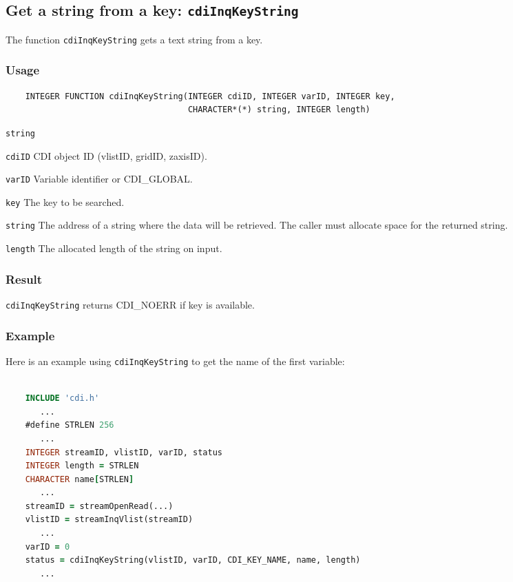 \subsection{Get a string from a key: \texttt{cdiInqKeyString}}
\label{cdiInqKeyString}

The function {\texttt{cdiInqKeyString}} gets a text string from a key.

\subsubsection*{Usage}

\begin{verbatim}
    INTEGER FUNCTION cdiInqKeyString(INTEGER cdiID, INTEGER varID, INTEGER key, 
                                     CHARACTER*(*) string, INTEGER length)
\end{verbatim}

\hspace*{4mm}\begin{minipage}[]{15cm}
\begin{deflist}{\texttt{string}\ }
\item[\texttt{cdiID}]
CDI object ID (vlistID, gridID, zaxisID).
\item[\texttt{varID}]
Variable identifier or CDI\_GLOBAL.
\item[\texttt{key}]
The key to be searched.
\item[\texttt{string}]
The address of a string where the data will be retrieved.
                    The caller must allocate space for the returned string.
\item[\texttt{length}]
The allocated length of the string on input.
\end{deflist}
\end{minipage}

\subsubsection*{Result}

{\texttt{cdiInqKeyString}} returns CDI\_NOERR if key is available.


\subsubsection*{Example}

Here is an example using {\texttt{cdiInqKeyString}} to get the name of the first variable:

\begin{lstlisting}[language=Fortran, backgroundcolor=\color{pyellow}, basicstyle=\small, columns=flexible]

    INCLUDE 'cdi.h'
       ...
    #define STRLEN 256
       ...
    INTEGER streamID, vlistID, varID, status
    INTEGER length = STRLEN
    CHARACTER name[STRLEN]
       ...
    streamID = streamOpenRead(...)
    vlistID = streamInqVlist(streamID)
       ...
    varID = 0
    status = cdiInqKeyString(vlistID, varID, CDI_KEY_NAME, name, length)
       ...
\end{lstlisting}


